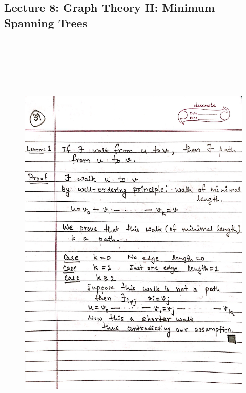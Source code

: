 \newpage
{\color{black} \subsection*{Lecture 8: Graph Theory II: Minimum Spanning Trees}}
\begin{figure}[H]
    \centering
    \includegraphics[width=16cm, height=21cm]{"./MIT-6.042J/MIT-6042J-039"}
\end{figure}

